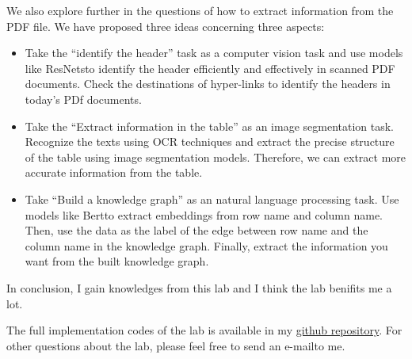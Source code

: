 \documentclass[12pt, a4paper]{article}
\theoremstyle{definition}
\begin{document}
We also explore further in the questions of how to extract information from the PDF file. We have proposed three ideas concerning three aspects:
\begin{itemize}
	\item Take the ``identify the header'' task as a computer vision task and use models like ResNets\footnotemark[1] to identify the header efficiently and effectively in scanned PDF documents. Check the destinations of hyper-links to identify the headers in today's PDf documents.
	\item Take the ``Extract information in the table'' as an image segmentation task. Recognize the texts using OCR techniques and extract the precise structure of the table using image segmentation models. Therefore, we can extract more accurate information from the table.
	\item Take ``Build a knowledge graph'' as an natural language processing task. Use models like Bert\footnotemark[2] to extract embeddings from row name and column name. Then, use the data as the label of the edge between row name and the column name in the knowledge graph. Finally, extract the information you want from the built knowledge graph.
\end{itemize}

In conclusion, I gain knowledges from this lab and I think the lab benifits me a lot.

The full implementation codes of the lab is available in my \href{https://github.com/Galaxies99/EE447-CourseData/tree/main/Labs/Lab4}{github repository}. For other questions about the lab, please feel free to send an e-mail\footnotemark[3] to me.

\end{document}
